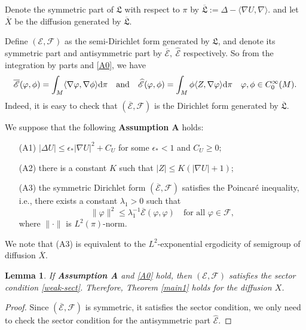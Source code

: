 \documentclass[12pt,reqno]{article}
\newtheorem{lem}[thm]{Lemma}
\theoremstyle{definition}
\theoremstyle{remark}
\theoremstyle{example}
\numberwithin{equation}{section}
\newcommand{\scr}[1]{\mathscr #1}
\def\d{\mathrm{d}}
\def\e{\scr E}
\def\d{\rm d}
\def\lb{\label}
\def\lan{\langle}\def\ran{\rangle}
\def\bar{\overline}
\def\d{{\mbox{\rm d}}}
\begin{document}
{Denote the symmetric part of  $\mathfrak{L}$ with respect to $\pi$ by  $\bar{\mathfrak{L}}:=\Delta-\lan\nabla U,\nabla\ran.$
and let $\bar{X}$ be the diffusion generated by $\bar{\mathfrak{L}}$.



 Define $(\e,\scr{F})$ as the semi-Dirichlet form generated by $\mathfrak{L}$, and denote its symmetric part and antisymmetric part by $\bar{\e},\ \widehat{\e}$ respectively. So from the integration by parts and \eqref{A0}, we have
$$
\bar{\e}(\varphi, \phi)= \int_M\lan \nabla \varphi,\nabla \phi\ran \d \pi\quad \text{and}\quad \widehat{\e}(\varphi, \phi)=\int_M \phi\lan Z,\nabla\varphi\ran \d\pi  \quad \varphi, \phi \in C_{0}^{\infty}(M).
$$
 Indeed, it is easy to check that $(\bar{\e},\scr{F})$ is the Dirichlet form generated by $\bar{\mathfrak{L}}$.

We suppose that the following {\bf Assumption A} holds:
\begin{itemize}

\item[(\rm A1)] $|\Delta U| \leq \epsilon_*|\nabla U|^{2}+C_U$ for some $\epsilon_*<1$  and $C_U \geq 0;$

\item[(\rm A2)] there is a constant $K$ such that $|Z| \leq K(|\nabla U|+1)$;

\item[(\rm A3)] the symmetric Dirichlet form $(\bar{\e},\scr{F})$ satisfies the Poincar\'{e} inequality, i.e., there exists a constant $\lambda_1>0$ such that
$$\|\varphi\|^2\leq \lambda_1^{-1}\bar{\e}(\varphi,\varphi)\quad \text{for all } \varphi\in\scr{F},$$
where $\|\cdot\|$ is $L^2(\pi)$-norm.
\end{itemize}

We note that (A3) is equivalent to the $L^2$-exponential ergodicity of semigroup of diffusion $\bar{X}$.




\begin{lem}\lb{Lang-sec}
If {\bf Assumption A} and \eqref{A0} hold, then $(\mathscr{E},\scr{F})$ satisfies the sector condition \eqref{weak-sect}. Therefore, Theorem \ref{main1} holds for the diffusion $X$.
\end{lem}
\begin{proof}

	
Since $(\bar{\e},\scr{F})$ is symmetric, it  satisfies the sector condition, we only need to check the sector condition for the antisymmetric part $\widehat{\e}$.


\end{proof}}
\end{document}
